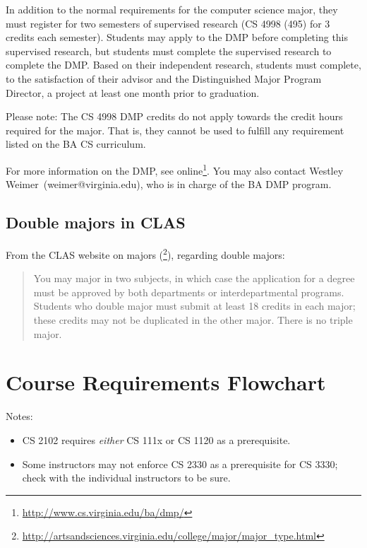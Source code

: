 \documentclass[10pt,letter]{book}
\makeatletter
\newenvironment{itemlist}{
\begin{itemize}
\setlength{\itemsep}{0pt}
\setlength{\parskip}{0pt}}
{\end{itemize}}
\newcommand{\badmp}{Westley Weimer}
\newcommand{\badmpemail}{weimer@virginia.edu}
\newcommand{\mysection}[1]{\section{#1}\renewcommand{\rightmark}{#1}}
\newcommand{\myurl}[1]{\footnote{\scriptsize\url{#1}}}
\makeatother
\begin{document}
In addition to the normal requirements for the computer science major,
they must register for two semesters of supervised research (CS 4998 (495)
for 3 credits each semester). Students may apply to the DMP before
completing this supervised research, but students must complete the
supervised research to complete the DMP. Based on their independent
research, students must complete, to the satisfaction of their advisor
and the Distinguished Major Program Director, a project at least one
month prior to graduation.

Please note: The CS 4998 DMP credits do not apply towards the credit
hours required for the major. That is, they cannot be used to fulfill
any requirement listed on the BA CS curriculum.

For more information on the DMP, see
online\myurl{http://www.cs.virginia.edu/ba/dmp/}. You may
also contact \badmp\ (\badmpemail), who is in charge of the BA DMP
program.

\subsection{Double majors in CLAS}

From the CLAS website on majors
(\myurl{http://artsandsciences.virginia.edu/college/major/major_type.html}),
regarding double majors:

\begin{quotation}
\noindent You may major in two subjects, in which case the application
for a degree must be approved by both departments or inter\-departmental
programs. Students who double major must submit at least 18 credits in
each major; these credits may not be duplicated in the other
major. There is no triple major.
\end{quotation}


\clearpage

\mysection{Course Requirements Flowchart}

\begin{figure}[h!]
\end{figure}

\noindent Notes:

\begin{itemlist}
\item CS 2102 requires {\em either} CS 111x or CS 1120 as a
  prerequisite.
\item Some instructors may not enforce CS 2330 as a prerequisite for
  CS 3330; check with the individual instructors to be sure.
\end{itemlist}
\end{document}
